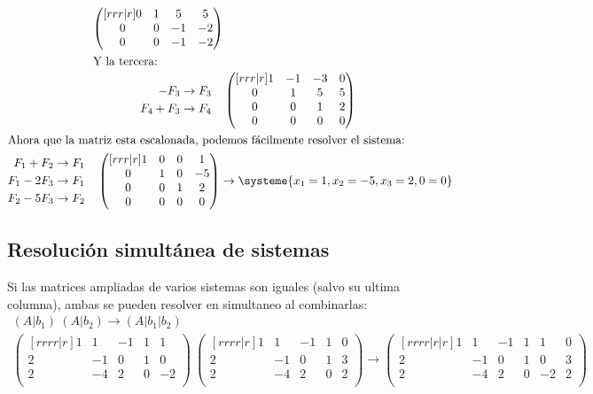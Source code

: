 \documentclass[../teoria.root.tex]{subfiles}
\begin{document}
\begin{gather*}
\begin{align*}
\begin{pmatrix}[rrr|r]
			0 &  1 &  5 &  5\\
			0 &  0 & -1 & -2\\
			0 &  0 & -1 & -2
		\end{pmatrix}\\
		\intertext{Y la tercera:}
		\begin{aligned}
			-F_3&\to F_3\\
			F_4+F_3&\to F_4\\
		\end{aligned}\quad
		&\begin{pmatrix}[rrr|r]
			1 & -1 & -3 & 0\\
			0 &  1 &  5 & 5\\
			0 &  0 &  1 & 2\\
			0 &  0 &  0 & 0
		\end{pmatrix}
	\end{align*}\\
	\intertext{Ahora que la matriz esta escalonada, podemos fácilmente resolver
	el sistema:}
	\begin{aligned}
		F_1+F_2&\to F_1\\
		F_1-2F_3&\to F_1\\
		F_2-5F_3&\to F_2
	\end{aligned}\quad
	\begin{pmatrix}[rrr|r]
		1 & 0 & 0 &  1\\
		0 & 1 & 0 & -5\\
		0 & 0 & 1 &  2\\
		0 & 0 & 0 &  0
	\end{pmatrix}\to
	\systeme{x_1=1,x_2=-5,x_3=2,0=0}
\end{gather*}

\subsection{Resolución simultánea de sistemas}

Si las matrices ampliadas de varios sistemas son iguales (salvo su ultima
columna), ambas se pueden resolver en simultaneo al combinarlas:
\begin{gather*}
	(A|b_1)\:(A|b_2)\to (A|b_1|b_2)\\
	\begin{pmatrix}[rrrr|r]
		1 &  1 & -1 & 1 &  1 \\
		2 & -1 &  0 & 1 &  0 \\
		2 & -4 &  2 & 0 & -2 \\
	\end{pmatrix}\:
	\begin{pmatrix}[rrrr|r]
		1 &  1 & -1 & 1 & 0 \\
		2 & -1 &  0 & 1 & 3 \\
		2 & -4 &  2 & 0 & 2 \\
	\end{pmatrix}\to
	\begin{pmatrix}[rrrr|r|r]
		1 &  1 & -1 & 1 &  1 & 0 \\
		2 & -1 &  0 & 1 &  0 & 3 \\
		2 & -4 &  2 & 0 & -2 & 2 \\
	\end{pmatrix}
\end{gather*}
\end{document}
